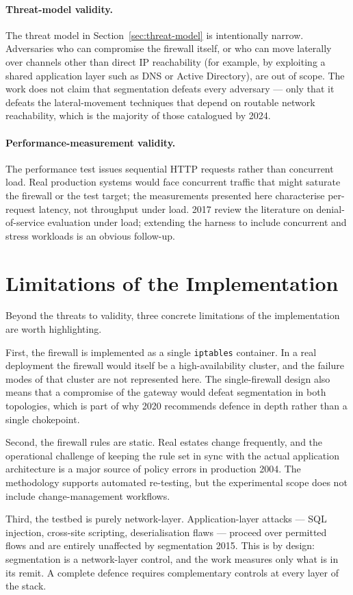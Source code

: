 \paragraph{Threat-model validity.} The threat model in Section~\ref{sec:threat-model} is intentionally narrow. Adversaries who can compromise the firewall itself, or who can move laterally over channels other than direct IP reachability (for example, by exploiting a shared application layer such as DNS or Active Directory), are out of scope. The work does not claim that segmentation defeats every adversary --- only that it defeats the lateral-movement techniques that depend on routable network reachability, which is the majority of those catalogued by \textcite{MITRE}{2024}.

\paragraph{Performance-measurement validity.} The performance test issues sequential HTTP requests rather than concurrent load. Real production systems would face concurrent traffic that might saturate the firewall or the test target; the measurements presented here characterise per-request latency, not throughput under load. \textcite{Bonguet and Bellaiche}{2017} review the literature on denial-of-service evaluation under load; extending the harness to include concurrent and stress workloads is an obvious follow-up.

\section{Limitations of the Implementation}

Beyond the threats to validity, three concrete limitations of the implementation are worth highlighting.

First, the firewall is implemented as a single \texttt{iptables} container. In a real deployment the firewall would itself be a high-availability cluster, and the failure modes of that cluster are not represented here. The single-firewall design also means that a compromise of the gateway would defeat segmentation in both topologies, which is part of why \textcite{Anderson}{2020} recommends defence in depth rather than a single chokepoint.

Second, the firewall rules are static. Real estates change frequently, and the operational challenge of keeping the rule set in sync with the actual application architecture is a major source of policy errors in production \parencite{Wool}{2004}. The methodology supports automated re-testing, but the experimental scope does not include change-management workflows.

Third, the testbed is purely network-layer. Application-layer attacks --- SQL injection, cross-site scripting, deserialisation flaws --- proceed over permitted flows and are entirely unaffected by segmentation \parencite{Pfleeger, Pfleeger and Margulies}{2015}. This is by design: segmentation is a network-layer control, and the work measures only what is in its remit. A complete defence requires complementary controls at every layer of the stack.
